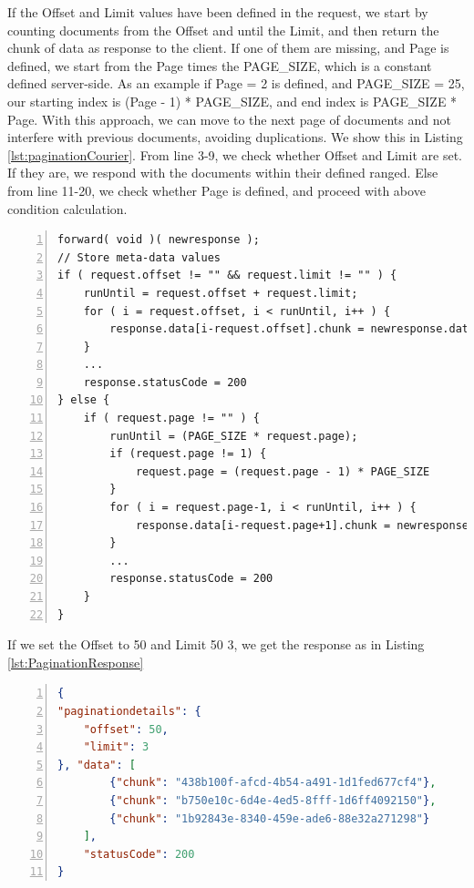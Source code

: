 \documentclass[12pt]{article}
\begin{document}
If the Offset and Limit values have been defined in the request, we start by counting documents from the Offset and until the Limit, and then return the chunk of data as response to the client. If one of them are missing, and Page is defined, we start from the Page times the PAGE\_SIZE, which is a constant defined server-side. As an example if Page = 2 is defined, and PAGE\_SIZE = 25, our starting index is (Page - 1) * PAGE\_SIZE, and end index is PAGE\_SIZE * Page. With this approach, we can move to the next page of documents and not interfere with previous documents, avoiding duplications. We show this in Listing \ref{lst:paginationCourier}. From line 3-9, we check whether Offset and Limit are set. If they are, we respond with the documents within their defined ranged. Else from line 11-20, we check whether Page is defined, and proceed with above condition calculation.
\\
\begin{lstlisting}[caption=Courier operations for the Pagination Service, 
    captionpos=b, label={lst:paginationCourier}, frame=single, breaklines=true, numbers=left, basicstyle=\scriptsize]
forward( void )( newresponse );
// Store meta-data values
if ( request.offset != "" && request.limit != "" ) {
    runUntil = request.offset + request.limit;
    for ( i = request.offset, i < runUntil, i++ ) {
        response.data[i-request.offset].chunk = newresponse.data[i].chunk
    }
    ...
    response.statusCode = 200
} else {
    if ( request.page != "" ) {
        runUntil = (PAGE_SIZE * request.page);
        if (request.page != 1) {
            request.page = (request.page - 1) * PAGE_SIZE
        }
        for ( i = request.page-1, i < runUntil, i++ ) {
            response.data[i-request.page+1].chunk = newresponse.data[i].chunk
        }
        ...
        response.statusCode = 200
    }
}   
\end{lstlisting}

If we set the Offset to 50 and Limit 50 3, we get the response as in Listing \ref{lst:PaginationResponse}

\begin{lstlisting}[caption=The response to the client based on Offset and Limit meta-data, 
    captionpos=b, language=json, label={lst:PaginationResponse}, numbers=left]
{
"paginationdetails": {
    "offset": 50,
    "limit": 3
}, "data": [
        {"chunk": "438b100f-afcd-4b54-a491-1d1fed677cf4"},
        {"chunk": "b750e10c-6d4e-4ed5-8fff-1d6ff4092150"},
        {"chunk": "1b92843e-8340-459e-ade6-88e32a271298"}
    ],
    "statusCode": 200
}
\end{lstlisting}
\end{document}
